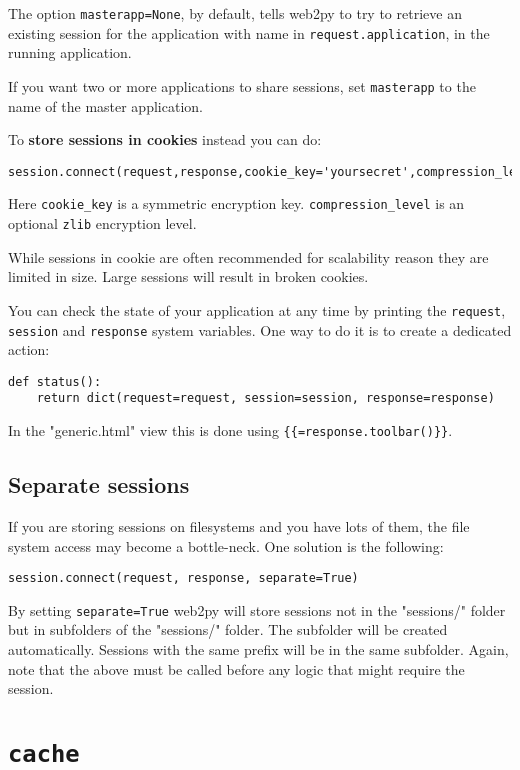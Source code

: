 \documentclass[justified,sixbynine,notoc]{tufte-book}
\def\ft{\small\tt}
\begin{document}
\begin{fullwidth}
The option {\ft masterapp=None}, by default, tells web2py to try to retrieve an existing session for the application with name in {\ft request.application}, in the running application.

If you want two or more applications to share sessions, set {\ft masterapp} to the name of the master application.

To {\bf store sessions in cookies} instead you can do:

\begin{lstlisting}
session.connect(request,response,cookie_key='yoursecret',compression_level=None)
\end{lstlisting}

Here {\ft cookie\_key} is a symmetric encryption key.
{\ft compression\_level} is an optional {\ft zlib} encryption level.

While sessions in cookie are often recommended for scalability reason they are limited in size. Large sessions will result in broken cookies.

You can check the state of your application at any time by printing the {\ft request}, {\ft session} and {\ft response} system variables. One way to do it is to create a dedicated action:
\begin{lstlisting}
def status():
    return dict(request=request, session=session, response=response)
\end{lstlisting}

In the "generic.html" view this is done using {\ft \{\{=response.toolbar()\}\}}.

\goodbreak\subsection{Separate sessions}

If you are storing sessions on filesystems and you have lots of them, the file system access may become a bottle-neck. One solution is the following:
\begin{lstlisting}
session.connect(request, response, separate=True)
\end{lstlisting}

By setting {\ft separate=True} web2py will store sessions not in the "sessions/" folder but in subfolders of the "sessions/" folder. The subfolder will be created automatically. Sessions with the same prefix will be in the same subfolder. Again, note that the above must be called before any logic that might require the session.

\goodbreak\section{{\ft cache}}


\end{fullwidth}
\end{document}
